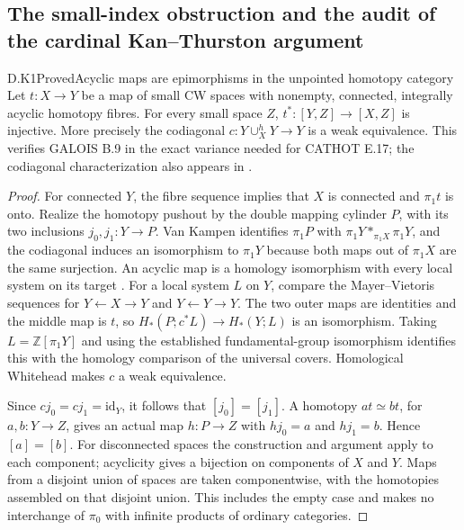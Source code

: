 \subsection{The small-index obstruction and the audit of the cardinal Kan--Thurston argument}

\begin{result}{D.K1}{Proved}{Acyclic maps are epimorphisms in the unpointed homotopy category}
Let $t:X\to Y$ be a map of small CW spaces with nonempty, connected,
integrally acyclic homotopy fibres. For every small space $Z$,
$t^*:[Y,Z]\to[X,Z]$ is injective. More precisely the codiagonal
$c:Y\cup_X^hY\to Y$ is a weak equivalence. This verifies GALOIS B.9
in the exact variance needed for CATHOT E.17; the codiagonal
characterization also appears in
\citet[Theorem~2.9]{ABuchholtzDeJongRijke2025}.
\end{result}
\begin{proof}
For connected $Y$, the fibre sequence implies that $X$ is connected
and $\pi_1t$ is onto. Realize the homotopy pushout by the double
mapping cylinder $P$, with its two inclusions $j_0,j_1:Y\to P$.
Van Kampen identifies $\pi_1P$ with
$\pi_1Y*_{\pi_1X}\pi_1Y$, and the codiagonal induces an isomorphism
to $\pi_1Y$ because both maps out of $\pi_1X$ are the same
surjection. An acyclic map is a homology isomorphism with every
local system on its target
\citep[Definition/Proposition~1.2]{AHausmannHusemoller1979}.
For a local system $L$ on $Y$, compare the Mayer--Vietoris sequences
for $Y\leftarrow X\to Y$ and $Y\leftarrow Y\to Y$. The two outer
maps are identities and the middle map is $t$, so
$H_*(P;c^*L)\to H_*(Y;L)$ is an isomorphism. Taking
$L=\mathbb Z[\pi_1Y]$ and using the established fundamental-group
isomorphism identifies this with the homology comparison of the
universal covers. Homological Whitehead makes $c$ a weak
equivalence.

Since $cj_0=cj_1=\mathrm{id}_Y$, it follows that $[j_0]=[j_1]$.
A homotopy $at\simeq bt$, for $a,b:Y\to Z$, gives an actual map
$h:P\to Z$ with $hj_0=a$ and $hj_1=b$. Hence $[a]=[b]$.
For disconnected spaces the construction and argument apply to
each component; acyclicity gives a bijection on components of
$X$ and $Y$. Maps from a disjoint union of spaces are taken
componentwise, with the homotopies assembled on that disjoint
union. This includes the empty case and makes no interchange of
$\pi_0$ with infinite products of ordinary categories.
\end{proof}

